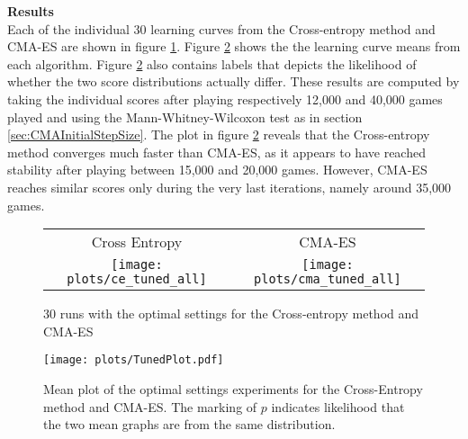 \textbf{Results}\\
Each of the individual 30 learning curves from the Cross-entropy method
and CMA-ES are shown in figure \ref{fig:tunedAll}. Figure \ref{fig:TunedMean} shows the the
learning curve means from each algorithm. Figure \ref{fig:TunedMean} also contains 
labels that depicts the likelihood of whether the two score distributions actually differ.
These results are computed by taking the individual scores after playing respectively 
12,000 and 40,000 games played and using the Mann-Whitney-Wilcoxon test
as in section \ref{sec:CMAInitialStepSize}. The plot in figure \ref{fig:TunedMean}
reveals that the Cross-entropy method converges much faster than CMA-ES, as it 
appears to have reached stability after playing between 15,000 and 20,000 games. However,
CMA-ES reaches similar scores only during the very last iterations, namely around 35,000 games.
\begin{figure}[H]
\begin{tabular}{@{}c@{}c@{}}
Cross Entropy & CMA-ES\\
\texttt{[image: plots/ce\_tuned\_all]} &
\texttt{[image: plots/cma\_tuned\_all]}
\end{tabular}
\caption{30 runs with the optimal settings for the Cross-entropy method and CMA-ES \label{fig:tunedAll}}
\end{figure}

\begin{figure}[H]
\centering
\texttt{[image: plots/TunedPlot.pdf]}
\caption{Mean plot of the optimal settings experiments for the Cross-Entropy method and CMA-ES. 
The marking of $p$ indicates likelihood that the two mean graphs are from the same 
distribution.\label{fig:TunedMean}}
\end{figure}

